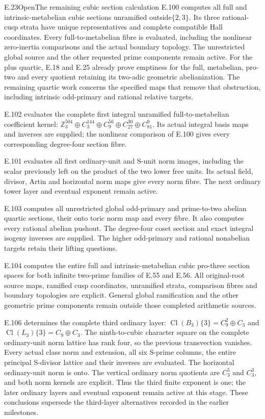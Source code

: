\begin{statement}{E.23}{Open}{The remaining cubic section calculation}
E.100 computes all full and intrinsic-metabelian cubic
sections unramified outside$\{2,3\}$. Its three rational-cusp
strata have unique representatives and complete compatible
Hall coordinates. Every full-to-metabelian fibre is evaluated,
including the nonlinear zero-inertia comparisons and the
actual boundary topology. The unrestricted global source
and the other requested prime components remain active.
For the plus quartic, E.18 and E.25 already prove emptiness
for the full, metabelian, pro-two and every quotient retaining
its two-adic geometric abelianization. The remaining quartic
work concerns the specified maps that remove that obstruction,
including intrinsic odd-primary and rational relative targets.


E.102 evaluates the complete first integral unramified
full-to-metabelian coefficient kernel:
$\mathbb Z_3^{504}\oplus C_3^{144}\oplus C_9^{56}
\oplus C_{27}^{30}\oplus C_{81}^{9}$.
Its actual integral basis maps and inverses are supplied;
the nonlinear comparison of E.100 gives every corresponding
degree-four section fibre.


E.101 evaluates all first ordinary-unit and S-unit norm
images, including the scalar previously left on the product
of the two lower free units. Its actual field, divisor,
Artin and horizontal norm maps give every norm fibre.
The next ordinary tower layer and eventual exponent remain active.

E.103 computes all unrestricted global odd-primary and
prime-to-two abelian quartic sections, their onto toric norm
map and every fibre. It also computes every rational abelian
pushout. The degree-four coset section and exact integral
isogeny inverses are supplied. The higher odd-primary and
rational nonabelian targets retain their lifting questions.

E.104 computes the entire full and intrinsic-metabelian
cubic pro-three section spaces for both infinite two-prime
families of E.55 and E.56. All original-root source maps,
ramified cusp coordinates, unramified strata, comparison
fibres and boundary topologies are explicit. General global
ramification and the other geometric prime components remain
outside those completed arithmetic sources.


E.106 determines the complete third ordinary layer:
$\operatorname{Cl}(B_3)\{3\}=C_9^2\oplus C_3$ and
$\operatorname{Cl}(L_3)\{3\}=C_9\oplus C_3$.
The ninth-to-cubic character square on the complete
ordinary-unit norm lattice has rank four, so the previous
transvection vanishes. Every actual class norm and extension,
all six S-prime columns, the entire principal S-divisor
lattice and their inverses are evaluated. The horizontal
ordinary-unit norm is onto. The vertical ordinary norm
quotients are $C_3^5$ and $C_3^3$, and both norm kernels
are explicit. Thus the third finite exponent is one;
the later ordinary layers and eventual exponent remain
active at this stage. These conclusions supersede the
third-layer alternatives recorded in the earlier milestones.



\end{statement}
